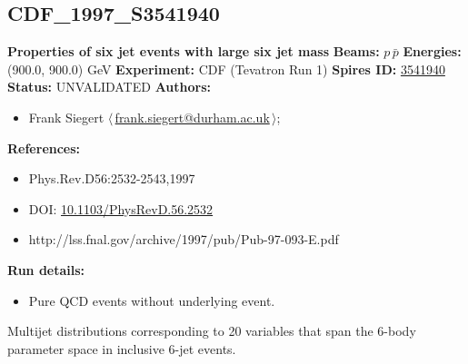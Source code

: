 \subsection[CDF\_1997\_S3541940]{CDF\_1997\_S3541940\,\cite{Abe:1997yb}}
\textbf{Properties of six jet events with large six jet mass}\newline
\textbf{Beams:} $p$\,$\bar{p}$ \newline
\textbf{Energies:} (900.0, 900.0) GeV \newline
\textbf{Experiment:} CDF (Tevatron Run 1) \newline
\textbf{Spires ID:} \href{http://www.slac.stanford.edu/spires/find/hep/www?rawcmd=key+3541940}{3541940}\newline
\textbf{Status:} UNVALIDATED\newline
\textbf{Authors:}
\begin{itemize}
  \item Frank Siegert $\langle\,$\href{mailto:frank.siegert@durham.ac.uk}{frank.siegert@durham.ac.uk}$\,\rangle$;
\end{itemize}
\textbf{References:}
\begin{itemize}
  \item Phys.Rev.D56:2532-2543,1997
  \item DOI: \href{http://dx.doi.org/10.1103/PhysRevD.56.2532}{10.1103/PhysRevD.56.2532}
  \item http://lss.fnal.gov/archive/1997/pub/Pub-97-093-E.pdf
\end{itemize}
\textbf{Run details:}
\begin{itemize}

  \item Pure QCD events without underlying event.\end{itemize}

\noindent Multijet distributions corresponding to 20 variables that span the 6-body parameter space in inclusive 6-jet events.

\clearpage


\clearpage

